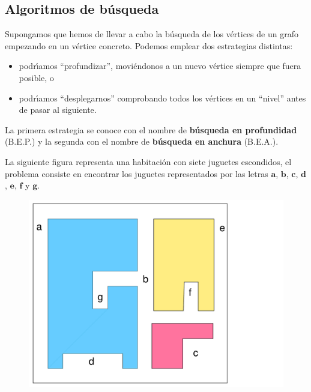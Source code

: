 \documentclass[twoside]{report}
\newcommand{\bs}[1]{\boldsymbol{#1}}
\begin{document}
\subsection{Algoritmos de b\'{u}squeda}

Supongamos que hemos de llevar a cabo la b\'{u}squeda de los v\'{e}rtices de un grafo em\-pe\-zan\-do en un v\'{e}rtice concreto.
Podemos emplear dos estrategias distintas:
        \begin{itemize}
            \item podr\'{\i}amos ``profundizar'', movi\'{e}ndonos a un nuevo v\'{e}rtice siempre que fuera posible, o
            \vspace{-0.2cm}
            \item podr\'{\i}amos ``desplegarnos'' comprobando todos los v\'{e}rtices en un ``nivel'' antes de pasar al siguiente.
        \end{itemize}

\vspace{0.2cm}
La primera estrategia se conoce con el nombre de \textbf{b\'{u}squeda en profundidad} (B.E.P.) y la segunda con el nombre de
\textbf{b\'{u}squeda en anchura} (B.E.A.).
\vspace{0.2cm}

La siguiente figura representa una habitaci\'{o}n con siete juguetes escondidos, el problema consiste en encontrar los juguetes representados por las
letras $\bs{a}$, $\bs{b}$, $\bs{c}$, $\bs{d}$, $\bs{e}$, $\bs{f}$ y $\bs{g}$.


      \begin{center}
           \begin{figure}[h!]\centering
           \includegraphics[scale=0.14]{pdfs/B1.pdf}
           \end{figure}
      \end{center}
\end{document}
